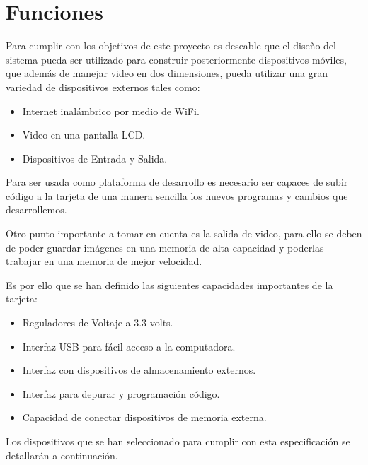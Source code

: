 \section{Funciones}

Para cumplir con los objetivos de este proyecto es deseable que el
diseño del sistema pueda ser utilizado para construir posteriormente
dispositivos m\'{o}viles, que adem\'{a}s de manejar video en dos dimensiones,
pueda utilizar una gran variedad de dispositivos externos tales como: 
\begin{itemize}
\item Internet inal\'{a}mbrico por medio de WiFi.
\item Video en una pantalla LCD.
\item Dispositivos de Entrada y Salida.
\end{itemize}
Para ser usada como plataforma de desarrollo es necesario ser capaces
de subir c\'{o}digo a la tarjeta de una manera sencilla los nuevos
programas y cambios que desarrollemos. 

Otro punto importante a tomar en cuenta es la salida de video, para
ello se deben de poder guardar imágenes en una memoria de alta capacidad
y poderlas trabajar en una memoria de mejor velocidad. 

Es por ello que se han definido las siguientes capacidades importantes
de la tarjeta:
\begin{itemize}
\item Reguladores de Voltaje a 3.3 volts.
\item Interfaz USB para fácil acceso a la computadora.
\item Interfaz con dispositivos de almacenamiento externos.
\item Interfaz para depurar y programación c\'{ó}digo.
\item Capacidad de conectar dispositivos de memoria externa. 
\end{itemize}
Los dispositivos que se han seleccionado para cumplir con esta especificaci\'{o}n
se detallarán a continuación.\pagebreak{}
